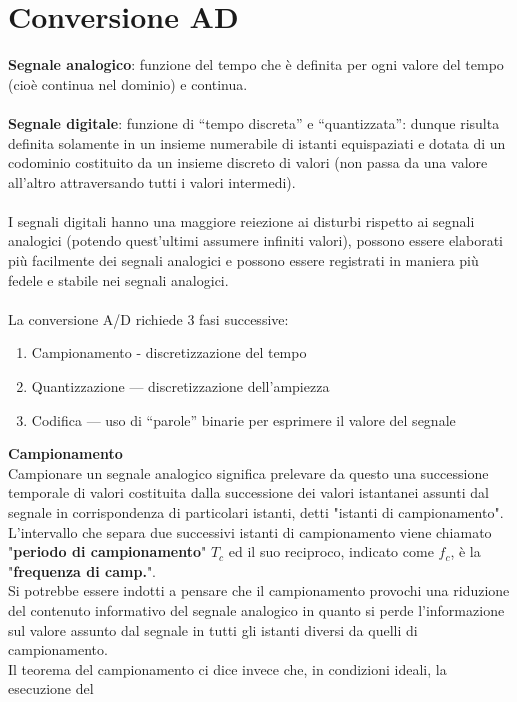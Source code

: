 \documentclass{article}
\begin{document}
\section{Conversione AD}
\textbf{Segnale analogico}: funzione del tempo che è definita per ogni valore del tempo (cioè continua nel 
dominio) e continua. \\\\
\textbf{Segnale digitale}: funzione di “tempo discreta” e “quantizzata”: dunque risulta definita solamente 
in un insieme numerabile di istanti equispaziati e dotata di un codominio costituito da un insieme 
discreto di valori (non passa da una valore all'altro attraversando tutti i valori intermedi). \\\\
I segnali digitali hanno una maggiore reiezione ai disturbi rispetto ai segnali analogici (potendo 
quest'ultimi assumere infiniti valori), possono essere elaborati più facilmente dei segnali analogici 
e possono essere registrati in maniera più fedele e stabile nei segnali analogici. \\\\
La conversione A/D richiede 3 fasi successive: 
\begin{enumerate}
    \item Campionamento - discretizzazione del tempo 
    \item Quantizzazione — discretizzazione dell’ampiezza 
    \item Codifica — uso di “parole” binarie per esprimere il valore del segnale
\end{enumerate}
\textbf{Campionamento}\\
Campionare un segnale analogico significa prelevare da questo una successione temporale di 
valori costituita dalla successione dei valori istantanei assunti dal segnale in corrispondenza di 
particolari istanti, detti "istanti di campionamento". \\
L'intervallo che separa due successivi istanti di 
campionamento viene chiamato "\textbf{periodo di campionamento}" $T_{c}$ ed il suo reciproco, indicato 
come $f_{c}$, è la "\textbf{frequenza di camp.}". \\ Si potrebbe essere indotti a pensare 
che il campionamento provochi una riduzione del contenuto informativo del segnale analogico in 
quanto si perde l'informazione sul valore assunto dal segnale in tutti gli istanti diversi da quelli di 
campionamento. \\
Il teorema del campionamento ci dice invece che, in condizioni ideali, la esecuzione del 
\end{document}
